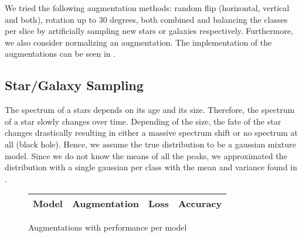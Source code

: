 We tried the following augmentation methods: random flip (horizontal, vertical and both), rotation up to 30 degrees, both combined and balancing the classes per slice by artificially sampling new stars or galaxies respectively. Furthermore, we also consider normalizing an augmentation.
The implementation of the augmentations can be seen in .

\subsection{Star/Galaxy Sampling}
The spectrum of a stars depends on its age and its size. Therefore, the spectrum of a star slowly changes over time. Depending of the size, the fate of the star changes drastically resulting in either a massive spectrum shift or no spectrum at all (black hole).
Hence, we assume the true distribution to be a gaussian mixture model. Since we do not know the means of all the peaks, we approximated the distribution with a single gaussian per class with the mean and variance found in .

\begin{figure}
    \begin{tabularx}{\linewidth}{mmmm}
        \hline
        Model & Augmentation & Loss & Accuracy \\
        \hline
    \end{tabularx}
    \caption{Augmentations with performance per model}
    \label{AugPerformance}
\end{figure}
